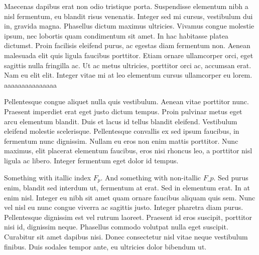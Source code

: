Maecenas dapibus erat non odio tristique porta. Suspendisse elementum nibh a nisl fermentum, eu blandit risus venenatis. Integer sed mi cursus, vestibulum dui in, gravida magna. Phasellus dictum maximus ultricies. Vivamus congue molestie ipsum, nec lobortis quam condimentum sit amet. In hac habitasse platea dictumst. Proin facilisis eleifend purus, ac egestas diam fermentum non. Aenean malesuada elit quis ligula faucibus porttitor. Etiam ornare ullamcorper orci, eget sagittis nulla fringilla ac. Ut ac metus ultricies, porttitor orci ac, accumsan erat. Nam eu elit elit. Integer vitae mi at leo elementum cursus ullamcorper eu lorem. aaaaaaaaaaaaaaa


Pellentesque congue aliquet nulla quis vestibulum. Aenean vitae porttitor nunc. Praesent imperdiet erat eget justo dictum tempus. Proin pulvinar metus eget arcu elementum blandit. Duis et lacus id tellus blandit eleifend. Vestibulum eleifend molestie scelerisque. Pellentesque convallis ex sed ipsum faucibus, in fermentum nunc dignissim. Nullam eu eros non enim mattis porttitor. Nunc maximus, elit placerat elementum faucibus, eros nisi rhoncus leo, a porttitor nisl ligula ac libero. Integer fermentum eget dolor id tempus.

Something with itallic index $F_p$. And something with non-itallic $F\_p$. Sed purus enim, blandit sed interdum ut, fermentum at erat. Sed in elementum erat. In at enim nisl. Integer eu nibh sit amet quam ornare faucibus aliquam quis sem. Nunc vel nisl eu nunc congue viverra ac sagittis justo. Integer pharetra diam purus. Pellentesque dignissim est vel rutrum laoreet. Praesent id eros suscipit, porttitor nisi id, dignissim neque. Phasellus commodo volutpat nulla eget suscipit. Curabitur sit amet dapibus nisi. Donec consectetur nisl vitae neque vestibulum finibus. Duis sodales tempor ante, eu ultricies dolor bibendum ut.

